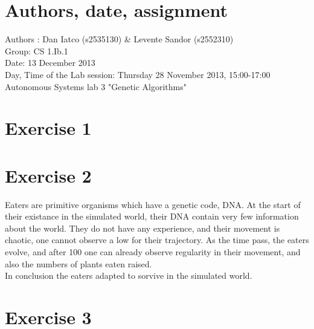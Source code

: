 \documentclass[a4paper,10pt]{article}
\begin{document}
\section*{Authors, date, assignment}
Authors : Dan Iatco (s2535130) \& Levente Sandor (s2552310)\\
Group: CS 1.Ib.1\\
Date:  13 December 2013\\
Day, Time of the Lab session: Thursday 28 November 2013, 15:00-17:00\\
Autonomous Systems lab 3 "Genetic Algorithms"\\

\section*{Exercise 1}

\section*{Exercise 2}
Eaters are primitive organisms which have a genetic code, DNA. At the start of their existance in the simulated world,
their DNA contain very few information about the world. They do not have any experience, and their movement is chaotic,
one cannot observe a low for their trajectory. As the time pass, the eaters evolve, and after 100 one can already observe
regularity in their movement, and also the numbers of plants eaten raised.\\ In conclusion the eaters adapted to sorvive
in the simulated world.


\section*{Exercise 3}
\end{document}
